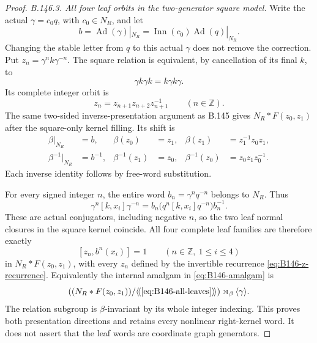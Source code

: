 \begin{proof}
\emph{B.146.3. All four leaf orbits in the two-generator square model.}
Write the actual $\gamma=c_0q$, with $c_0\in N_R$, and let
\[
 b=\operatorname{Ad}(\gamma)|_{N_R}
       =\operatorname{Inn}(c_0)\operatorname{Ad}(q)|_{N_R}.
\]
Changing the stable letter from $q$ to this actual $\gamma$ does
not remove the correction. Put $z_n=\gamma^nk\gamma^{-n}$.
The square relation is equivalent, by cancellation of its final
$k$, to
\[
 \gamma k\gamma k=k\gamma k\gamma.
\]
Its complete integer orbit is
\begin{equation}\label{eq:B146-z-recurrence}
 z_n=z_{n+1}z_{n+2}z_{n+1}^{-1}\qquad(n\in\mathbb Z).
\end{equation}
The same two-sided inverse-presentation argument as B.145 gives
$N_R*F(z_0,z_1)$ after the square-only kernel filling. Its shift is
\begin{equation}\label{eq:B146-shift}
\begin{aligned}
 \beta|_{N_R}&=b,&\beta(z_0)&=z_1,&
 \beta(z_1)&=z_1^{-1}z_0z_1,\\
 \beta^{-1}|_{N_R}&=b^{-1},&\beta^{-1}(z_1)&=z_0,&
 \beta^{-1}(z_0)&=z_0z_1z_0^{-1}.
\end{aligned}
\end{equation}
Each inverse identity follows by free-word substitution.

For every signed integer $n$, the entire word
$b_n=\gamma^nq^{-n}$ belongs to $N_R$. Thus
\begin{equation}\label{eq:B146-leaf-conjugator}
 \gamma^n[k,x_i]\gamma^{-n}
    =b_n\bigl(q^n[k,x_i]q^{-n}\bigr)b_n^{-1}.
\end{equation}
These are actual conjugators, including negative $n$, so the two
leaf normal closures in the square kernel coincide. All four
complete leaf families are therefore exactly
\begin{equation}\label{eq:B146-all-leaves}
 [z_n,b^n(x_i)]=1\qquad(n\in\mathbb Z,\ 1\leq i\leq4)
\end{equation}
in $N_R*F(z_0,z_1)$, with every $z_n$ defined by the invertible
recurrence \eqref{eq:B146-z-recurrence}. Equivalently the internal
amalgam in \eqref{eq:B146-amalgam} is
\[
 \left((N_R*F(z_0,z_1))/
       \langle\!\langle\eqref{eq:B146-all-leaves}\rangle\!\rangle\right)
       \rtimes_\beta\langle\gamma\rangle.
\]
The relation subgroup is $\beta$-invariant by its whole integer
indexing. This proves both presentation directions and retains
every nonlinear right-kernel word. It does not assert that the
leaf words are coordinate graph generators.


\end{proof}
